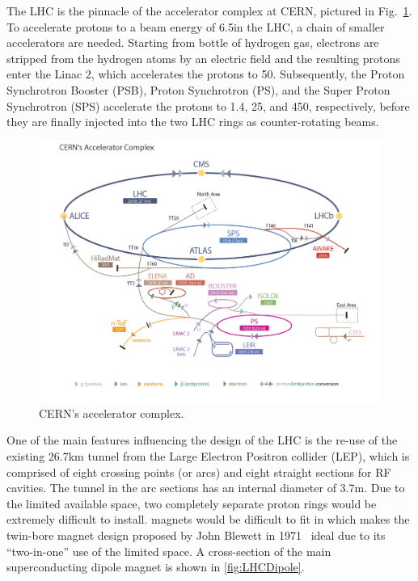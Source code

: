 The LHC is the pinnacle of the accelerator
complex at CERN, pictured in Fig.~\ref{fig:LHCComplex}.  To accelerate
protons to a beam energy of 6.5\TeV in the LHC, a chain of smaller
accelerators are needed. Starting from bottle of hydrogen gas,
electrons are stripped from the hydrogen atoms by an electric field
and the resulting protons enter the Linac 2, which accelerates the
protons to 50\MeV. Subsequently, the Proton Synchrotron Booster (PSB), Proton Synchrotron (PS), and the
Super Proton Synchrotron (SPS) accelerate the protons to 1.4\GeV, 25\GeV, and 450\GeV, respectively, before they are finally injected
into the two LHC rings as counter-rotating beams.

\begin{figure}
\includegraphics[width=.9\textwidth]{figs/cms/LHC_default.jpg}
\caption{CERN's accelerator complex.\label{fig:LHCComplex}}
\end{figure}

One of the main features influencing the design of the LHC is the re-use of the
existing 26.7\unit{km} tunnel from the Large Electron Positron collider (LEP), which is
comprised of eight crossing points (or arcs) and eight straight sections for
RF cavities. The tunnel in the arc sections has an internal diameter of 3.7\unit{m}. Due to the limited available space, two completely separate
proton rings would be extremely difficult to install.  magnets
would be  difficult to fit in which makes the twin-bore magnet design proposed by John
Blewett in 1971~\cite{Blewett:1068131} ideal due to its
``two-in-one'' use of the limited space. A cross-section of the main superconducting
dipole magnet is shown in \ref{fig:LHCDipole}.

